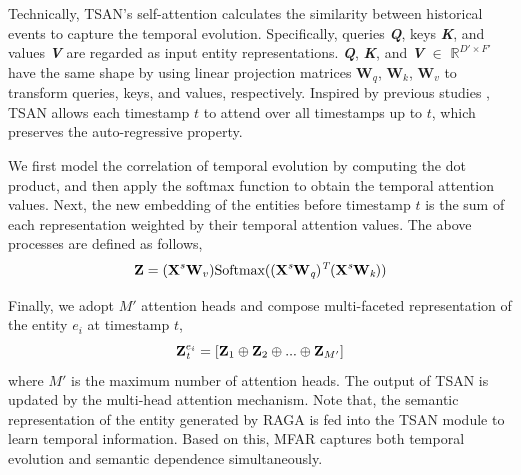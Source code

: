\documentclass[sigconf,natbib=true]{acmart}
\begin{document}

Technically, TSAN's self-attention calculates the similarity between historical events to capture the temporal evolution. Specifically, queries \textbf{\emph{Q}}, keys \textbf{\emph{K}}, and values \textbf{\emph{V}}  are regarded as input entity representations. \textbf{\emph{Q}}, \textbf{\emph{K}}, and \textbf{\emph{V}} $\in$  $\mathbb{R}^{D' \times F'}$ have the same shape by using linear projection matrices $\textbf{W}_q$, $\textbf{W}_k$, $\textbf{W}_v$ to transform queries, keys, and values, respectively. %
  Inspired by previous studies \cite{RE-GCN, RE-NET}, TSAN allows each timestamp $t$ to attend over all timestamps up to  $t$, which preserves the auto-regressive property. 

We first model the correlation of temporal evolution by computing the dot product, and then apply the softmax function to obtain the temporal attention values. Next, the new embedding of the entities before timestamp $t$ is the sum of each representation weighted by their temporal attention values. The above processes are defined as follows,
\begin{equation}
	\textbf{Z} = (\textbf{X}^s \textbf{W}_v) \rm Softmax ((\textbf{X}^{\emph{s}} \textbf{W}_\emph{q})^{\emph{T}}(\textbf{X}^{\emph{s}} \textbf{W}_\emph{k}))
\end{equation}

Finally, we adopt $M'$ attention heads and compose multi-faceted representation of the entity $e_i$ at timestamp $t$, 
\begin{equation}
	\textbf{Z}_{\emph{t}}^{e_i} = [\textbf{Z}_{1}\oplus \textbf{Z}_{2}\oplus... \oplus \textbf{Z}_{M'}]
\end{equation}
where $M'$ is the maximum number of attention heads. The output of TSAN is updated by the multi-head attention  mechanism. Note that, the semantic representation of the entity generated by RAGA is fed into the TSAN module to learn  temporal information. Based on this, MFAR captures both temporal evolution and semantic  dependence simultaneously.
\end{document}
